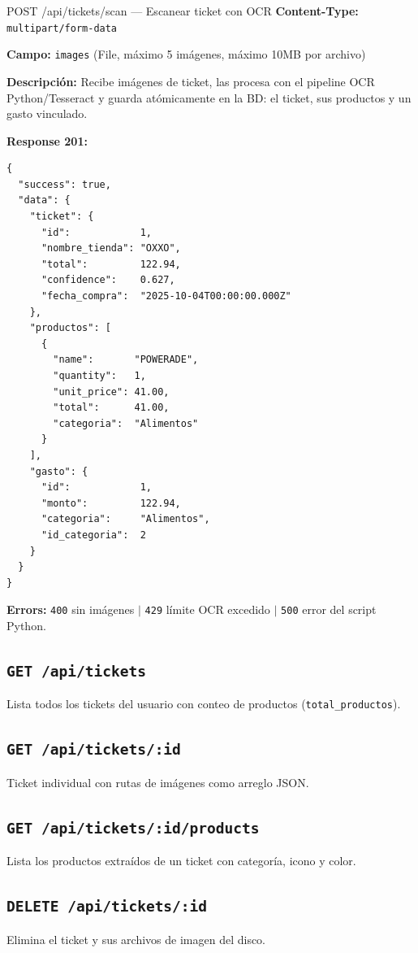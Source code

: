 \begin{epbox}{POST /api/tickets/scan --- Escanear ticket con OCR}
\textbf{Content-Type:} \texttt{multipart/form-data}

\textbf{Campo:} \texttt{images} (File, máximo 5 imágenes, máximo 10MB por archivo)

\textbf{Descripción:} Recibe imágenes de ticket, las procesa con el pipeline OCR Python/Tesseract y guarda atómicamente en la BD: el ticket, sus productos y un gasto vinculado.

\textbf{Response 201:}
\begin{lstlisting}[style=json]
{
  "success": true,
  "data": {
    "ticket": {
      "id":            1,
      "nombre_tienda": "OXXO",
      "total":         122.94,
      "confidence":    0.627,
      "fecha_compra":  "2025-10-04T00:00:00.000Z"
    },
    "productos": [
      {
        "name":       "POWERADE",
        "quantity":   1,
        "unit_price": 41.00,
        "total":      41.00,
        "categoria":  "Alimentos"
      }
    ],
    "gasto": {
      "id":            1,
      "monto":         122.94,
      "categoria":     "Alimentos",
      "id_categoria":  2
    }
  }
}
\end{lstlisting}

\textbf{Errors:} \texttt{400} sin imágenes $|$ \texttt{429} límite OCR excedido $|$ \texttt{500} error del script Python.
\end{epbox}

\subsection{\texttt{GET /api/tickets}}
Lista todos los tickets del usuario con conteo de productos (\texttt{total\_productos}).

\subsection{\texttt{GET /api/tickets/:id}}
Ticket individual con rutas de imágenes como arreglo JSON.

\subsection{\texttt{GET /api/tickets/:id/products}}
Lista los productos extraídos de un ticket con categoría, icono y color.

\subsection{\texttt{DELETE /api/tickets/:id}}
Elimina el ticket y sus archivos de imagen del disco.

